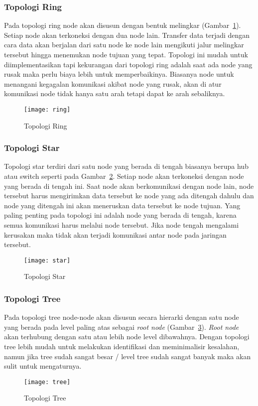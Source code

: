 \subsubsection{Topologi Ring}
Pada topologi ring node akan disusun dengan bentuk melingkar (Gambar~\ref{fig:ring}). Setiap node akan terkoneksi dengan dua node lain. Transfer data terjadi dengan cara data akan berjalan dari satu node ke node lain mengikuti jalur melingkar tersebut hingga menemukan node tujuan yang tepat. Topologi ini mudah untuk diimplementasikan tapi kekurangan dari topologi ring adalah saat ada node yang rusak maka perlu biaya lebih untuk memperbaikinya. Biasanya node untuk menangani kegagalan komunikasi akibat node yang rusak, akan di atur komunikasi node tidak hanya satu arah tetapi dapat ke arah sebaliknya.
\begin{figure} [H]
	\centering  
	\texttt{[image: ring]}  
	\caption[Topologi Ring]{Topologi Ring} 
	\label{fig:ring} 
\end{figure} 

\subsubsection{Topologi Star}
Topologi star terdiri dari satu node yang berada di tengah biasanya berupa hub atau switch seperti pada Gambar~\ref{fig:star}. Setiap node akan terkoneksi dengan node yang berada di tengah ini. Saat node akan berkomunikasi dengan node lain, node tersebut harus mengirimkan data tersebut ke node yang ada ditengah dahulu dan node yang ditengah ini akan meneruskan data tersebut ke node tujuan. Yang paling penting pada topologi ini adalah node yang berada di tengah, karena semua komunikasi harus melalui node tersebut. Jika node tengah mengalami kerusakan maka tidak akan terjadi komunikasi antar node pada jaringan tersebut.
\begin{figure} [H]
	\centering  
	\texttt{[image: star]}  
	\caption[Topologi Star]{Topologi Star} 
	\label{fig:star} 
\end{figure} 

\subsubsection{Topologi Tree}
Pada topologi tree node-node akan disusun secara hierarki dengan satu node yang berada pada level paling atas sebagai \textit{root node} (Gambar~\ref{fig:tree}). \textit{Root node} akan terhubung dengan satu atau lebih node level dibawahnya. Dengan topologi tree lebih mudah untuk melakukan identifikasi dan meminimalisir kesalahan, namun jika tree sudah sangat besar / level tree sudah sangat banyak maka akan sulit untuk mengaturnya.
\begin{figure} [H]
	\centering  
	\texttt{[image: tree]}  
	\caption[Topologi Tree]{Topologi Tree} 
	\label{fig:tree} 
\end{figure} 

